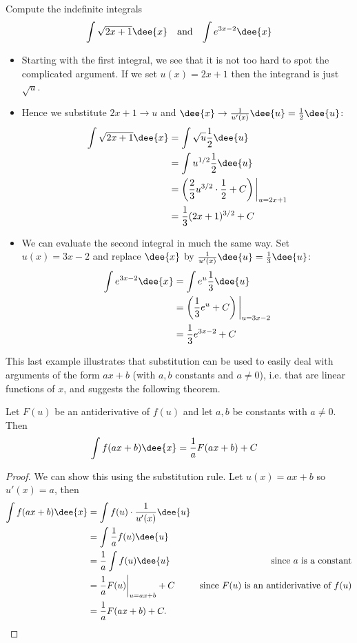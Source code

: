 \begin{eg}
Compute the indefinite integrals
\begin{align*}
  \int \sqrt{2x+1}\dee{x} && \text{and} && \int e^{3x-2}\dee{x}
\end{align*}
\soln
\begin{itemize}
 \item Starting with the first integral, we see that it is not too hard to spot
the complicated argument. If we set $u(x)=2x+1$ then the integrand is just $\sqrt{u}$.
\item Hence we substitute $2x+1 \rightarrow u$ and $\dee{x} \rightarrow
\frac{1}{u'(x)}\dee{u}=\frac{1}{2}\dee{u}$:
\begin{align*}
  \int \sqrt{2x+1}\dee{x}
&= \int \sqrt{u} \frac{1}{2} \dee{u} \\
&= \int u^{1/2} \frac{1}{2} \dee{u} \\
&= \left( \frac{2}{3}u^{3/2}\cdot\frac{1}{2}  +C\right)\bigg|_{u=2x+1}\\
&= \frac{1}{3} (2x+1)^{3/2} + C
\end{align*}
\item We can evaluate the second integral in much the same way. Set $u(x)=3x-2$ and
replace $\dee{x}$ by $\frac{1}{u'(x)}\dee{u} = \frac{1}{3}\dee{u}$:
\begin{align*}
  \int e^{3x-2}\dee{x}
&= \int e^u \frac{1}{3}\dee{u} \\
&= \left( \frac{1}{3} e^u + C\right)\bigg|_{u=3x-2}\\
&= \frac{1}{3} e^{3x-2} +C
\end{align*}
\end{itemize}
\end{eg}
This last example illustrates that substitution can be used to easily deal 
with arguments of the form $ax+b$ (with $a,b$ constants and $a\ne 0$), i.e. 
that are linear functions of $x$, and suggests the following theorem.
\begin{theorem}\label{thm subs linear}
Let $F(u)$ be an antiderivative of $f(u)$ and let $a,b$ be constants 
with $a\ne 0$. Then
\begin{align*}
  \int f(ax+b)\dee{x} &= \frac{1}{a} F(ax+b) +C
\end{align*}
\end{theorem}
\begin{proof}
 We can show this using the substitution rule. Let $u(x)=ax+b$ so $u'(x)=a$, then
\begin{align*}
  \int f(ax+b) \dee{x}
&= \int f(u) \cdot \frac{1}{u'(x)}\dee{u}\\
&= \int \frac{1}{a} f(u) \dee{u} \\
&= \frac{1}{a} \int f(u) \dee{u} & \text{since $a$ is a constant}\\
&= \frac{1}{a} F(u)\bigg|_{u=ax+b} +C & \text{since $F(u)$ is an antiderivative of
$f(u)$}\\
&= \frac{1}{a} F(ax+b) +C.
\end{align*}
\end{proof}
